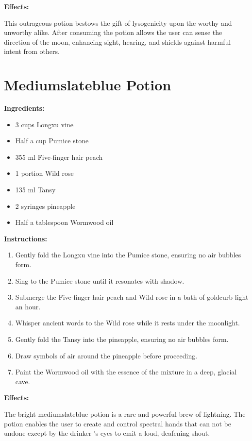 \documentclass{article}
\begin{document}
\textbf{Effects:}

This outrageous potion bestows the gift of lysogenicity upon the worthy and unworthy alike. After consuming the potion allows the user can sense the direction of the moon, enhancing sight, hearing, and shields against harmful intent from others.

\newpage
\section*{Mediumslateblue Potion}

\textbf{Ingredients:}

\begin{itemize}
  \item 3 cups Longxu vine
  \item Half a cup Pumice stone
  \item 355 ml Five-finger hair peach
  \item 1 portion Wild rose
  \item 135 ml Tansy
  \item 2 syringes pineapple
  \item Half a tablespoon Wormwood oil
\end{itemize}

\textbf{Instructions:}

\begin{enumerate}
  \item Gently fold the Longxu vine into the Pumice stone, ensuring no air bubbles form.
  \item Sing to the Pumice stone until it resonates with shadow.
  \item Submerge the Five-finger hair peach and Wild rose in a bath of goldcurb light an hour.
  \item Whisper ancient words to the Wild rose while it rests under the moonlight.
  \item Gently fold the Tansy into the pineapple, ensuring no air bubbles form.
  \item Draw symbols of air around the pineapple before proceeding.
  \item Paint the Wormwood oil with the essence of the mixture in a deep, glacial cave.
\end{enumerate}

\textbf{Effects:}

The bright mediumslateblue potion is a rare and powerful brew of lightning. The potion enables the user to create and control spectral hands that can not be undone except by the drinker 's eyes to emit a loud, deafening shout.
\end{document}
